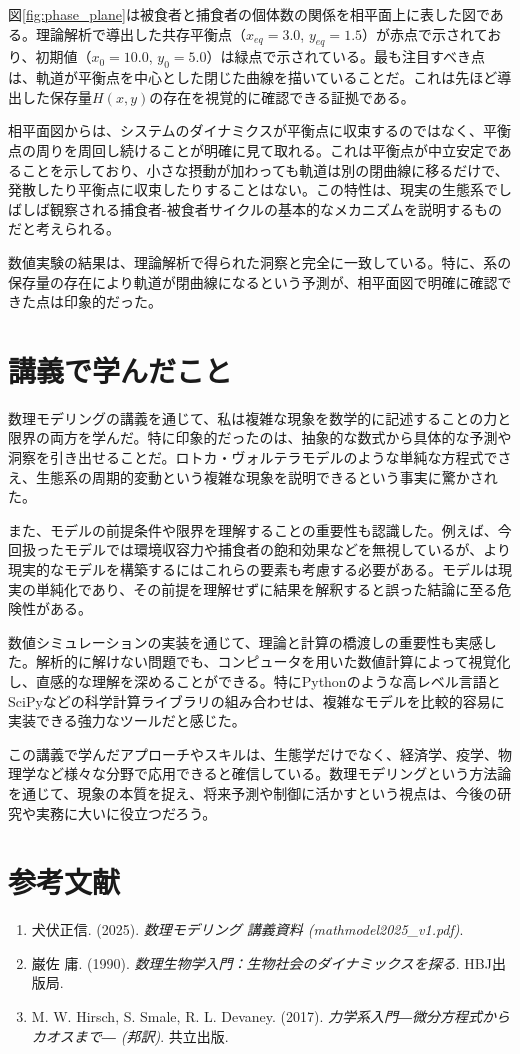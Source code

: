 \documentclass{article}
\begin{document}
図\ref{fig:phase_plane}は被食者と捕食者の個体数の関係を相平面上に表した図である。理論解析で導出した共存平衡点（$x_{eq}=3.0$, $y_{eq}=1.5$）が赤点で示されており、初期値（$x_0=10.0$, $y_0=5.0$）は緑点で示されている。最も注目すべき点は、軌道が平衡点を中心とした閉じた曲線を描いていることだ。これは先ほど導出した保存量$H(x,y)$の存在を視覚的に確認できる証拠である。

相平面図からは、システムのダイナミクスが平衡点に収束するのではなく、平衡点の周りを周回し続けることが明確に見て取れる。これは平衡点が中立安定であることを示しており、小さな摂動が加わっても軌道は別の閉曲線に移るだけで、発散したり平衡点に収束したりすることはない。この特性は、現実の生態系でしばしば観察される捕食者-被食者サイクルの基本的なメカニズムを説明するものだと考えられる。

数値実験の結果は、理論解析で得られた洞察と完全に一致している。特に、系の保存量の存在により軌道が閉曲線になるという予測が、相平面図で明確に確認できた点は印象的だった。

\section{講義で学んだこと}

数理モデリングの講義を通じて、私は複雑な現象を数学的に記述することの力と限界の両方を学んだ。特に印象的だったのは、抽象的な数式から具体的な予測や洞察を引き出せることだ。ロトカ・ヴォルテラモデルのような単純な方程式でさえ、生態系の周期的変動という複雑な現象を説明できるという事実に驚かされた。

また、モデルの前提条件や限界を理解することの重要性も認識した。例えば、今回扱ったモデルでは環境収容力や捕食者の飽和効果などを無視しているが、より現実的なモデルを構築するにはこれらの要素も考慮する必要がある。モデルは現実の単純化であり、その前提を理解せずに結果を解釈すると誤った結論に至る危険性がある。

数値シミュレーションの実装を通じて、理論と計算の橋渡しの重要性も実感した。解析的に解けない問題でも、コンピュータを用いた数値計算によって視覚化し、直感的な理解を深めることができる。特にPythonのような高レベル言語とSciPyなどの科学計算ライブラリの組み合わせは、複雑なモデルを比較的容易に実装できる強力なツールだと感じた。

この講義で学んだアプローチやスキルは、生態学だけでなく、経済学、疫学、物理学など様々な分野で応用できると確信している。数理モデリングという方法論を通じて、現象の本質を捉え、将来予測や制御に活かすという視点は、今後の研究や実務に大いに役立つだろう。

\section{参考文献}

\begin{enumerate}
\item 犬伏正信. (2025). \textit{数理モデリング 講義資料 (mathmodel2025\_v1.pdf)}.
\item 巌佐 庸. (1990). \textit{数理生物学入門：生物社会のダイナミックスを探る}. HBJ出版局.
\item M. W. Hirsch, S. Smale, R. L. Devaney. (2017). \textit{力学系入門―微分方程式からカオスまで― (邦訳)}. 共立出版.
\end{enumerate}
\end{document}

